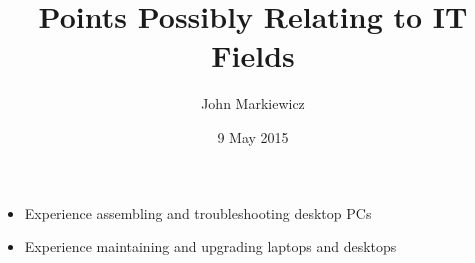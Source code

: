 \documentclass[11pt]{article}
\begin{document}
\title{Points Possibly Relating to IT Fields}
\author{John Markiewicz}
\date{9 May 2015}
\maketitle
\begin{itemize}
	\item Experience assembling and troubleshooting desktop PCs
	\item Experience maintaining and upgrading laptops and desktops
\end{itemize}
\end{document}
